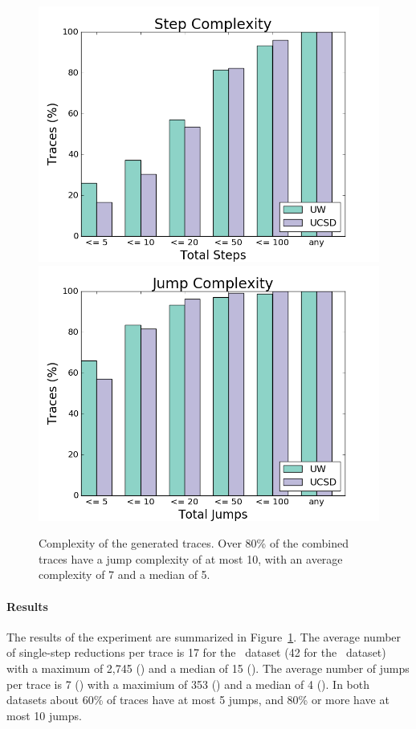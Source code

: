 %
\begin{figure}[t]
\includegraphics[width=0.7\linewidth]{nanomaly/trace_size_step.png}
\includegraphics[width=0.7\linewidth]{nanomaly/trace_size_jump.png}
\caption{Complexity of the generated traces. Over 80\% of the combined traces
  have a jump complexity of at most 10, with an average complexity of 7
  and a median of 5.}
\label{fig:results-complexity}
\end{figure}
%
\paragraph{Results}
\label{sec:nanomaly:results-complexity}
The results of the experiment are summarized in
Figure~\ref{fig:results-complexity}.
%
The average number of single-step reductions per trace is 17 for the
\ucsdbench\ dataset (42 for the \uwbench\ dataset) with a maximum of
2,745 () and a median of 15 ().
%
The average number of jumps per trace is 7 () with a
maximium of 353 () and a median of 4 ().
%
In both datasets about 60\% of traces have at most 5 jumps, and 80\% or more
have at most 10 jumps.


